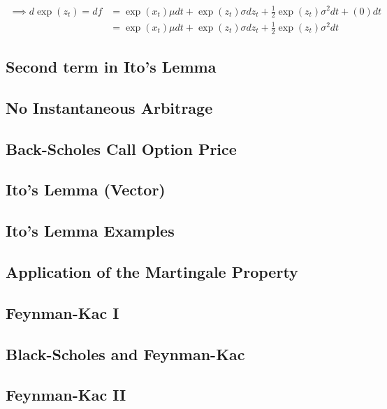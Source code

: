 \documentclass{article}
\begin{document}
\begin{itemize}
\begin{itemize}
\begin{align*}
\implies d \exp (z_t) = df 
&= \exp(x_t) \mu dt + \exp(z_t) \sigma dz_t + \frac{1}{2} \exp(z_t) \sigma^2 dt + (0) dt\\
&= \exp(x_t) \mu dt + \exp(z_t) \sigma dz_t + \frac{1}{2} \exp(z_t) \sigma^2 dt
\end{align*}


\end{itemize}



\subsection*{Second term in Ito's Lemma}
\subsection*{No Instantaneous Arbitrage}
\subsection*{Back-Scholes Call Option Price}
\subsection*{Ito's Lemma (Vector)}
\subsection*{Ito's Lemma Examples}
\subsection*{Application of the Martingale Property}
\subsection*{Feynman-Kac I}
\subsection*{Black-Scholes and Feynman-Kac}
\subsection*{Feynman-Kac II}
















\end{itemize}
\end{document}
